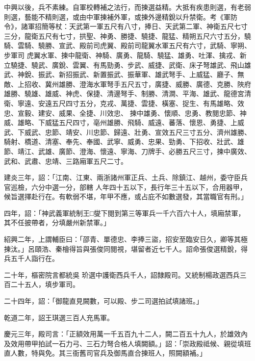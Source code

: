 \begin{pinyinscope}
 中興以後，兵不素練。自軍校轉補之法行，而揀選益精。大抵有疾患則選，有老弱則選，藝能不精則選，或由中軍揀補外軍，或揀外邊精銳以升禁衛。考《軍防令》，諸軍招簡等杖：天武第一軍五尺有八寸，捧日、天武第二軍、神衛五尺七寸三分，龍衛五尺有七寸，拱聖、神勇、勝捷、驍捷、龍猛、精朔五尺六寸五分，驍騎、雲騎、驍勝、宣武、殿前司虎翼、殿前司龍翼水軍五尺有六寸，武騎、寧朔、步軍司
 虎翼水軍、揀中龍衛、神騎、廣勇、龍騎、驍猛、雄勇、吐渾、擒戎、新立驍捷、驍武、廣銳、雲翼、有馬勁勇、步武、威捷、武衛、床子弩雄武、飛山雄武、神銳、振武、新招振武、新置振武、振華軍、雄武弩手、上威猛、廳子、無敵、上招收、冀州雄勝、澄海水軍弩手五尺五寸，廣捷、威勝、廣德、克勝、陜府雄勝、驍雄、雄威、神虎、保捷、清邊弩手、制勝、清澗、平海、雄武、龍德宮清衛、寧遠、安遠五尺四寸五分，克戎、萬捷、雲捷、橫塞、捉生、有馬雄略、效忠、宣毅、建安、威果、全捷、川效忠、
 揀中雄勇、懷順、忠勇、教閱忠節、神威、雄略、下威猛五尺四寸，亳州雄勝、飛騎、威遠、蕃落、懷恩、勇捷、上威武、下威武、忠節、靖安、川忠節、歸遠、壯勇、宣效五尺三寸五分、濟州雄勝、騎射、橋道、清塞、奉先、奉國、武寧、威勇、忠果、勁勇、下招收、壯武、雄節、靖江、武雄、廣節、澄海、懷遠、寧海、刀牌手、必勝五尺三寸，揀中廣效、武和、武肅、忠靖、三路廂軍五尺二寸。



 建炎三年，詔：「江南、江東、兩浙諸州軍正兵、土兵、除鎮江、越州，委守臣兵官巡檢，六分中選一分，部轄
 人年四十五以下，長行年三十五以下，合用器甲，候旨選擇赴行在。有軟弱不堪，年甲不應，或占庇不如數選發，其當職官有刑。」



 四年，詔：「神武義軍統制王□燮下閱到第三等軍兵一千六百六十人，填廂禁軍，其不任披帶者，分填嚴州新禁軍。」



 紹興二年，上謂輔臣曰：「邵青、單德忠、李捧三盜，招安至臨安日久，卿等其極揀汰。」呂頤浩、秦檜得旨與張俊同閱視，堪留者近七千人。詔命張俊選精銳，得兵五千人詣行在。



 二十年，樞密院言都統吳
 玠選中護衛西兵千人，詔隸殿司。又統制楊政選西兵三百二十五人，填步軍司。



 二十四年，詔：「御龍直見闕數，可以殿、步二司選拍試填諸班。」



 乾道二年，詔王琪選三百人充馬軍。



 慶元三年，殿司言：「正額效用萬一千五百九十二人，闕二百五十九人，於雄效內及效用帶甲拍試一石力弓、三石力弩合格人填闕額。」詔：「崇政殿祗候、親從填班直人數，特與免。其三衙舊司官兵及御馬直合揀班人，照闕額補。」




\end{pinyinscope}
